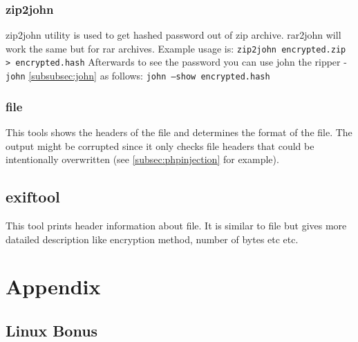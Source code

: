 \documentclass{article}[12pt]
\newcommand{\q}[1]{\texttt{#1}}
\begin{document}
{\subsubsection{zip2john}
zip2john utility is used to get hashed password out of zip archive.
rar2john will work the same but for rar archives.
Example usage is:\newline
\q{zip2john encrypted.zip > encrypted.hash} \newline
Afterwards to see the password you can use john the ripper - \q{john} \ref{subsubsec:john} as follows: \newline
\q{john  --show encrypted.hash}
\subsubsection{file}
\label{subsubsec:file}
This tools shows the headers of the file and determines the format of the file.
The output might be corrupted since it only checks file headers that could be intentionally overwritten (see \ref{subsec:phpinjection} for example).
\subsection{exiftool}
This tool prints header information about file.
It is similar to file but gives more datailed description like encryption method, number of bytes etc etc.




\section{Appendix}

\subsection{Linux Bonus}
}
\end{document}
